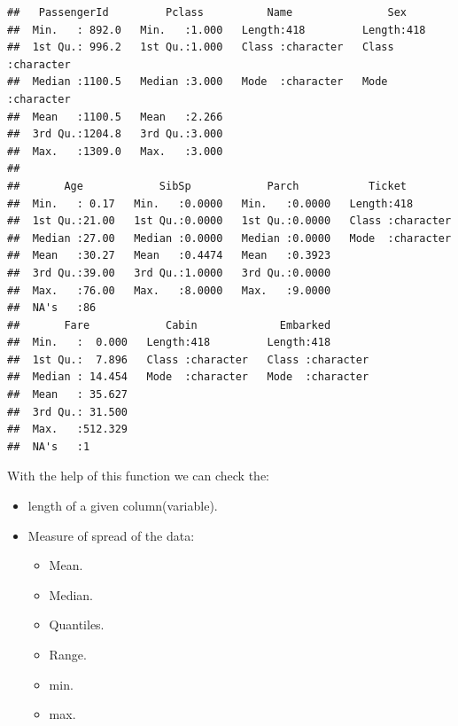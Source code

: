 \documentclass[
]{article}
\providecommand{\tightlist}{%
  \setlength{\itemsep}{0pt}\setlength{\parskip}{0pt}}
\begin{document}
\begin{verbatim}
##   PassengerId         Pclass          Name               Sex           
##  Min.   : 892.0   Min.   :1.000   Length:418         Length:418        
##  1st Qu.: 996.2   1st Qu.:1.000   Class :character   Class :character  
##  Median :1100.5   Median :3.000   Mode  :character   Mode  :character  
##  Mean   :1100.5   Mean   :2.266                                        
##  3rd Qu.:1204.8   3rd Qu.:3.000                                        
##  Max.   :1309.0   Max.   :3.000                                        
##                                                                        
##       Age            SibSp            Parch           Ticket         
##  Min.   : 0.17   Min.   :0.0000   Min.   :0.0000   Length:418        
##  1st Qu.:21.00   1st Qu.:0.0000   1st Qu.:0.0000   Class :character  
##  Median :27.00   Median :0.0000   Median :0.0000   Mode  :character  
##  Mean   :30.27   Mean   :0.4474   Mean   :0.3923                     
##  3rd Qu.:39.00   3rd Qu.:1.0000   3rd Qu.:0.0000                     
##  Max.   :76.00   Max.   :8.0000   Max.   :9.0000                     
##  NA's   :86                                                          
##       Fare            Cabin             Embarked        
##  Min.   :  0.000   Length:418         Length:418        
##  1st Qu.:  7.896   Class :character   Class :character  
##  Median : 14.454   Mode  :character   Mode  :character  
##  Mean   : 35.627                                        
##  3rd Qu.: 31.500                                        
##  Max.   :512.329                                        
##  NA's   :1
\end{verbatim}

With the help of this function we can check the:

\begin{itemize}
\tightlist
\item
  length of a given column(variable).
\item
  Measure of spread of the data:

  \begin{itemize}
  \tightlist
  \item
    Mean.
  \item
    Median.
  \item
    Quantiles.
  \item
    Range.
  \item
    min.
  \item
    max.
  \end{itemize}
\end{itemize}
\end{document}
